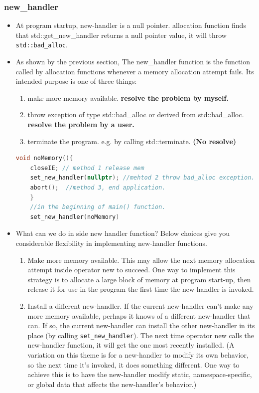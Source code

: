 \documentclass[a4paper,12pt,twoside]{book}
\begin{document}
\subsubsection{new\_handler}
\begin{itemize}
	
	\item At program startup, new-handler is a null pointer. allocation function finds that std::get\_new\_handler returns a null pointer value, it will throw \texttt{std::bad\_alloc}.
	
	\item  As shown by the previous section, The new\_handler function is the function called by allocation functions whenever a memory allocation attempt fails. Its intended purpose is one of three things:
	
	
	\begin{enumerate}
		\item make more memory available. \textbf{resolve the problem by myself.}
		
		\item throw exception of type std::bad\_alloc or derived from std::bad\_alloc. \textbf{resolve the problem by a user.}
		
		\item terminate the program. e.g. by calling std::terminate. \textbf{(No resolve)}
	\end{enumerate}
	
	\begin{lstlisting}[frame=single, language=c++]
	void noMemory(){
	closeIE; // method 1 release mem
	set_new_handler(nullptr); //mehtod 2 throw bad_alloc exception.
	abort();  //method 3, end application.
	}
	//in the beginning of main() function.
	set_new_handler(noMemory)
	\end{lstlisting}
	
	
	\item What can we do in side new handler function? Below choices give you considerable flexibility in implementing new-handler functions.
	\begin{enumerate}
		
		\item Make more memory available. This may allow the next memory allocation attempt inside operator new to succeed. One way to implement this strategy is to allocate a large block of memory at program start-up, then release it for use in the program the first time the new-handler is invoked.
		
		\item Install a different new-handler. If the current new-handler can't make any more memory available, perhaps it knows of a different new-handler that can. If so, the current new-handler can install the other new-handler in its place (by calling \texttt{set\_new\_handler}). The next time operator new calls the new-handler function, it will get the one most recently installed. (A variation on this theme is for a new-handler to modify its own behavior, so the next time it's invoked, it does something different. One way to achieve this is to have the new-handler modify static, namespace-specific, or global data that affects the new-handler's behavior.)
		

\end{enumerate}
\end{itemize}
\end{document}
